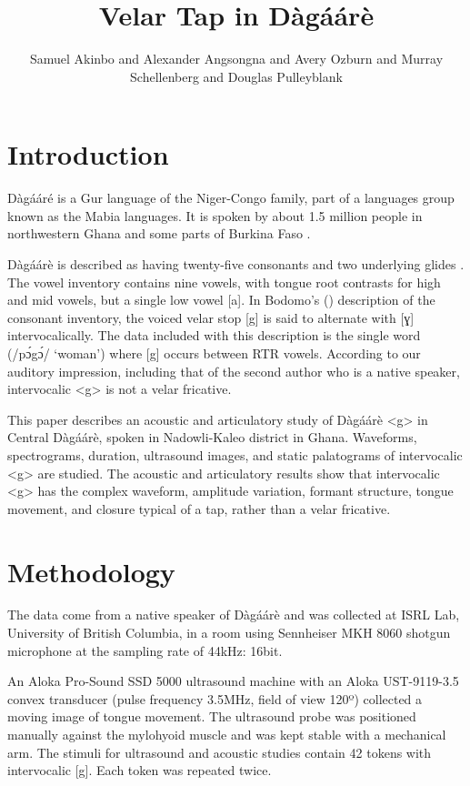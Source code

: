 \documentclass[output=paper, modfonts]{langscibook}
\title{Velar Tap in Dàgáárè}
\author{Samuel Akinbo\affiliation{University of British Columbia} and 
 Alexander Angsongna\affiliation{University of British Columbia} and
 Avery Ozburn\affiliation{University of British Columbia} and
 Murray Schellenberg\affiliation{University of British Columbia} and
 Douglas Pulleyblank\affiliation{University of British Columbia}}
\begin{document}
\graphicspath{{figures/}}
\maketitle

\section{Introduction} 
D\`ag\'a\'ar\'e is a Gur language of the Niger-Congo family, part of a languages group known as the Mabia languages. It is spoken by about 1.5 million people in northwestern Ghana and some parts of Burkina Faso \citep{kennedy1966collected, bodomo1997}.

Dàgáárè is described as having twenty-five consonants and two underlying glides \citep{bodomo1997}. The vowel inventory contains nine vowels, with tongue root contrasts for high and mid vowels, but a single low vowel [a]. In Bodomo's (\citeyear{bodomo1997}) description of the consonant inventory, the voiced velar stop [g] is said to alternate with [ɣ] intervocalically. The data included with this description is the single word (/p\'ɔg\'ɔ/ ‘woman’) where [g] occurs between RTR vowels. According to our auditory impression, including that of the second author who is a native speaker, intervocalic <g> is not a velar fricative.

This paper describes an acoustic and articulatory study of Dàgáárè <g> in Central Dàgáárè, spoken in Nadowli-Kaleo district in Ghana. Waveforms, spectrograms, duration, ultrasound images, and static palatograms of intervocalic <g> are studied. The acoustic and articulatory results show that intervocalic <g> has the complex waveform, amplitude variation, formant structure, tongue movement, and closure typical of a tap, rather than a velar fricative.
 

\section{Methodology}
The data come from a native speaker of Dàgáárè and was collected at ISRL Lab, University of British Columbia, in a room using Sennheiser MKH 8060 shotgun microphone at the sampling rate of 44kHz: 16bit.

An Aloka Pro-Sound SSD 5000 ultrasound machine with an Aloka UST-9119-3.5 convex transducer (pulse frequency 3.5MHz, field of view 120º) collected a moving image of tongue movement. The ultrasound probe was positioned manually against the mylohyoid muscle and was kept stable with a mechanical arm. The stimuli for ultrasound and acoustic studies contain 42 tokens with intervocalic [g]. Each token was repeated twice.
\end{document}
